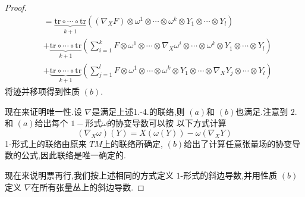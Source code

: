 \documentclass[../../几何与拓扑.tex]{subfiles}
\begin{document}
\begin{proof}
\[\begin{aligned}
        & =  \underbrace{\mathrm{tr}\circ \cdots \circ \mathrm{tr}}_{k+ 1} \left( \left(  \nabla _{X}F \right)\otimes  \omega ^{1}\otimes \cdots \otimes  \omega ^{k}\otimes Y_1\otimes \cdots \otimes Y_{l}  \right) \\ 
        & + \underbrace{\mathrm{tr}\circ \cdots \circ \mathrm{tr}}_{k+ 1} \left(  \sum _{i= 1}^{k}F\otimes  \omega ^{1}\otimes \cdots \otimes  \nabla _{X} \omega ^{i}\otimes \cdots \otimes  \omega ^{k}\otimes Y_1\otimes \cdots \otimes Y_{l}  \right) \\ 
         & + \underbrace{\mathrm{tr}\circ \cdots \circ \mathrm{tr}}_{k+ 1}\left( \sum _{j= 1}^{l}F\otimes  \omega ^{1}\otimes \cdots \otimes  \omega ^{k} \otimes Y_1\otimes \cdots \otimes  \nabla _{X}Y_{j}\otimes \cdots \otimes Y_{l} \right) 
    \end{aligned}
    \] 将迹并移项得到性质 \(  \left( b \right)   \).
    
    现在来证明唯一性.设 \(   \nabla   \)是满足上述1.-4.的联络,则 \(  \left( a \right)   \)和 \(  \left( b \right)   \)也满足.注意到 \(  2.  \)和 \(  \left( a \right)   \)给出每个 \(  1-  \)形式\(   \omega   \)的协变导数可以按
    以下方式计算 \begin{equation}\label{限制在余向量场上的协变导数}
        \left(  \nabla _{X} \omega  \right)\left( Y \right) =  X\left(  \omega \left( Y \right)  \right)-  \omega \left(  \nabla _{X}Y \right)    
    \end{equation}     1-形式上的联络由原来 \(  TM  \)上的联络所确定, \(  \left( b \right)   \)给出了计算任意张量场的协变导数的公式,因此联络是唯一确定的.
    
    现在来说明票再行,我们按上述相同的方式定义 \(  1  \)-形式的斜边导数,并用性质 \(  \left( b \right)   \)定义 \(   \nabla   \)在所有张量丛上的斜边导数.
    

\end{proof}
\end{document}
